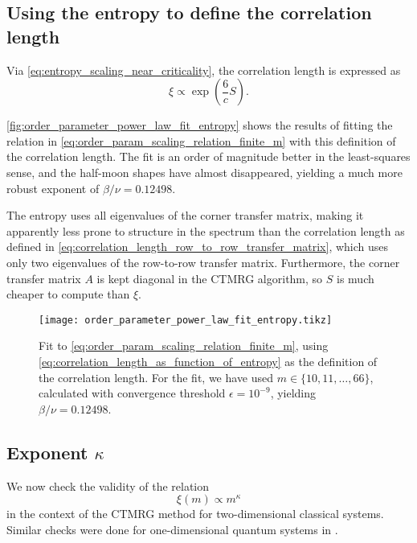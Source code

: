\subsection{Using the entropy to define the correlation length}\label{sec:entropy_to_define_correlation_length}
Via \autoref{eq:entropy_scaling_near_criticality}, the correlation length is expressed as
\begin{equation}\label{eq:correlation_length_as_function_of_entropy}
  \xi \propto \exp(\frac{6}{c}S).
\end{equation}

\autoref{fig:order_parameter_power_law_fit_entropy} shows the results of fitting the relation in
\autoref{eq:order_param_scaling_relation_finite_m} with this definition of the correlation length. The fit is an order
of magnitude better in the least-squares sense, and the half-moon shapes have almost disappeared,
yielding a much more robust exponent of $\beta/\nu = 0.12498$.

The entropy uses all eigenvalues of the corner transfer matrix, making it apparently less prone to structure in the
spectrum than the correlation length as defined in \autoref{eq:correlation_length_row_to_row_transfer_matrix},
which uses only two eigenvalues of the row-to-row transfer matrix.
Furthermore, the corner transfer matrix $A$ is kept diagonal in the CTMRG algorithm,
so $S$ is much cheaper to compute than $\xi$.

\begin{figure}
  \texttt{[image: order\_parameter\_power\_law\_fit\_entropy.tikz]}
  \caption{Fit to
  \autoref{eq:order_param_scaling_relation_finite_m}, using \autoref{eq:correlation_length_as_function_of_entropy} as the
  definition of the correlation length.
  For the fit, we have used $m \in \{ 10, 11, \dots, 66 \}$, calculated with convergence threshold $\epsilon = 10^{-9}$, yielding $\beta/\nu = 0.12498$.}
  \label{fig:order_parameter_power_law_fit_entropy}
\end{figure}

\subsection{Exponent $\kappa$}

We now check the validity of the relation
\begin{equation}\label{eq:xi_propto_kappa_2}
  \xi(m) \propto m^{\kappa}
\end{equation}
in the context of the CTMRG method for two-dimensional
classical systems. Similar checks were done for one-dimensional quantum systems in \cite{tagliacozzo2008scaling}.

